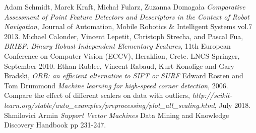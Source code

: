 \documentclass[11pt,a4paper]{article}
\begin{document}
\begin{thebibliography}{99}
 \setlength\baselineskip{5pt}
%

Adam Schmidt, Marek Kraft, Micha\l $ $ Fularz, Zuzanna Domaga\l a 
\textit{Comparative Assessment of Point Feature Detectors and Descriptors in the Context of Robot Navigation},
Journal of Automation, Mobile Robotics \& Intelligent Systems vol.7 2013.
Michael Calonder, Vincent Lepetit, Christoph Strecha, and Pascal Fua, 
\textit{BRIEF: Binary Robust Independent Elementary Features}, 11th European Conference on Computer Vision (ECCV), Heraklion, Crete. LNCS Springer, September 2010.
Ethan Rublee, Vincent Rabaud, Kurt Konolige and Gary Bradski, 
\textit{ORB: an efficient alternative to SIFT or SURF}
 Edward Rosten and Tom Drummond
\textit{Machine learning for high-speed corner detection},
 2006.
Compare the effect of different scalers on data with outliers,
\textit{http://scikit-learn.org/stable/auto\_examples/preprocessing/plot\_all\_scaling.html},
July 2018.
 Shmilovici Armin \textit{Support Vector Machines} Data Mining and Knowledge Discovery Handbook pp 231-247.


\end{thebibliography}

\listoffigures

\listoftables
\end{document}
